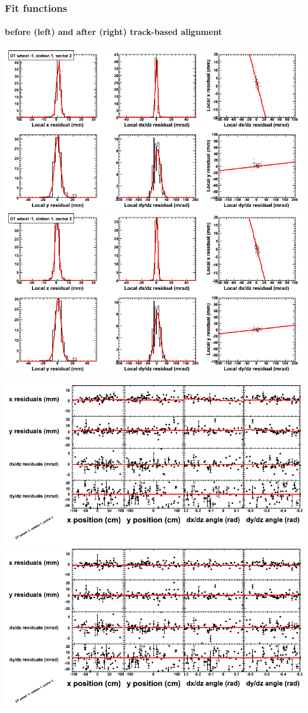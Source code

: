 \documentclass[compress]{beamer}
\begin{document}
\begin{frame}
\frametitle{Fit functions}
\framesubtitle{before (left) and after (right) track-based alignment}
\includegraphics[width=0.5\linewidth]{fitfunctions_re01/MBwhBst1sec02_bellcurves.png} \includegraphics[width=0.5\linewidth]{fitfunctions_re05/MBwhBst1sec02_bellcurves.png}

\includegraphics[width=0.5\linewidth]{fitfunctions_re01/MBwhBst1sec02_polynomials.png} \includegraphics[width=0.5\linewidth]{fitfunctions_re05/MBwhBst1sec02_polynomials.png}
\end{frame}
\end{document}

